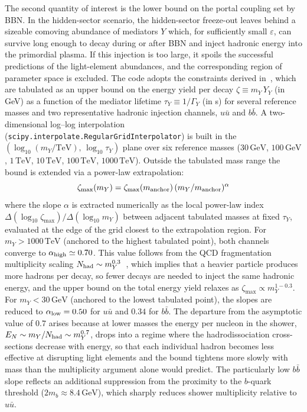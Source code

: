 \documentclass[11pt]{article}
\numberwithin{equation}{section}
\begin{document}
The second quantity of interest is the lower bound on the portal coupling set by BBN. In the hidden-sector scenario, the hidden-sector freeze-out leaves behind a sizeable comoving abundance of mediators $Y$ which, for sufficiently small $\varepsilon$, can survive long enough to decay during or after BBN and inject hadronic energy into the primordial plasma. If this injection is too large, it spoils the successful predictions of the light-element abundances, and the corresponding region of parameter space is excluded. The code adopts the constraints derived in~\cite{Kawasaki:2017bqm}, which are tabulated as an upper bound on the energy yield per decay $\zeta \equiv m_Y\,Y_Y$ (in GeV) as a function of the mediator lifetime $\tau_Y\equiv 1/\Gamma_Y$ (in s) for several reference masses and two representative hadronic injection channels, $u\bar u$ and $b\bar b$. A two-dimensional log--log interpolation (\texttt{scipy.interpolate.RegularGridInterpolator}) is built in the $(\log_{10}(m_Y/\mathrm{TeV}),\,\log_{10}\tau_Y)$ plane over six reference masses ($30\,\mathrm{GeV}$, $100\,\mathrm{GeV}$, $1\,\mathrm{TeV}$, $10\,\mathrm{TeV}$, $100\,\mathrm{TeV}$, $1000\,\mathrm{TeV}$). Outside the tabulated mass range the bound is extended via a power-law extrapolation:
\begin{equation}
    \zeta_{\max}(m_Y) = \zeta_{\max}(m_{\rm anchor})\,(m_Y/m_{\rm anchor})^\alpha
\end{equation}
where the slope $\alpha$ is extracted numerically as the local power-law index $\Delta\left(\log_{10}\zeta_{\max}\right)/\Delta\left(\log_{10}m_Y\right)$ between adjacent tabulated masses at fixed $\tau_Y$, evaluated at the edge of the grid closest to the extrapolation region.
For $m_Y > 1000\,\mathrm{TeV}$ (anchored to the highest tabulated point), both channels converge to $\alpha_{\rm high}\simeq 0.70$. This value follows from the QCD fragmentation multiplicity scaling $N_{\rm had}\sim m_Y^{0.3}$~\cite{Kawasaki:2017bqm}, which implies that a heavier particle produces more hadrons per decay, so fewer decays are needed to inject the same hadronic energy, and the upper bound on the total energy yield relaxes as $\zeta_{\max}\propto m_Y^{1-0.3}$. For $m_Y < 30\,\mathrm{GeV}$ (anchored to the lowest tabulated point), the slopes are reduced to $\alpha_{\rm low}=0.50$ for $u\bar u$ and $0.34$ for $b\bar b$. The departure from the asymptotic value of $0.7$ arises because at lower masses the energy per nucleon in the shower, $E_N\sim m_Y/N_{\rm had}\sim m_Y^{0.7}$, drops into a regime where the hadrodissociation cross-sections decrease with energy, so that each individual hadron becomes less effective at disrupting light elements and the bound tightens more slowly with mass than the multiplicity argument alone would predict. The particularly low $b\bar b$ slope reflects an additional suppression from the proximity to the $b$-quark threshold ($2m_b\approx 8.4\,\mathrm{GeV}$), which sharply reduces shower multiplicity relative to $u\bar u$.
\end{document}
